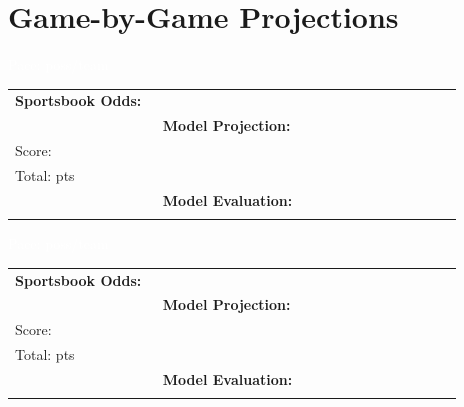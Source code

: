 \documentclass[10pt,a4paper]{article}
\begin{document}
\newpage

\section*{Game-by-Game Projections}

\noindent\colorbox{matchupbar}{\parbox{\dimexpr\linewidth-2\fboxsep}{%
  \vspace{3pt}\hspace{4pt}{\bfseries\large\textcolor{white}{Minnesota Timberwolves @ San Antonio Spurs}}
  \hfill{\small\textcolor{white}{Pace:  poss/team}}\vspace{3pt}
}}
\vspace{4pt}

\begin{tabular}{@{}p{0.32\linewidth}p{0.32\linewidth}p{0.33\linewidth}@{}}
\small
\textbf{Sportsbook Odds:} \\
&
\textbf{Model Projection:} \\
Score: \textbf{}\\
Total: \textbf{} pts\\
&
\textbf{Model Evaluation:} \\
\\
\end{tabular}

\vspace{8pt}

\noindent\colorbox{matchupbar}{\parbox{\dimexpr\linewidth-2\fboxsep}{%
  \vspace{3pt}\hspace{4pt}{\bfseries\large\textcolor{white}{Philadelphia 76ers @ New York Knicks}}
  \hfill{\small\textcolor{white}{Pace:  poss/team}}\vspace{3pt}
}}
\vspace{4pt}

\begin{tabular}{@{}p{0.32\linewidth}p{0.32\linewidth}p{0.33\linewidth}@{}}
\small
\textbf{Sportsbook Odds:} \\
&
\textbf{Model Projection:} \\
Score: \textbf{}\\
Total: \textbf{} pts\\
&
\textbf{Model Evaluation:} \\
\\
\end{tabular}

\vspace{8pt}
\end{document}
